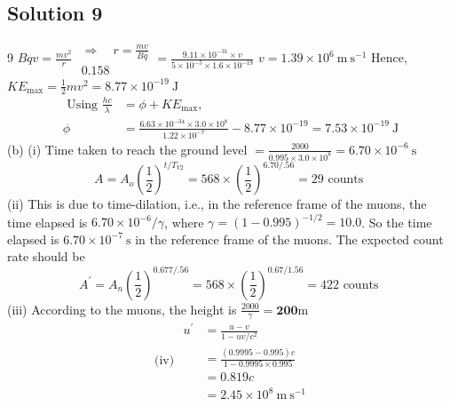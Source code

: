 \documentclass{article}
\begin{document}
\subsection{Solution 9}
9
$B q v=\frac{m v^{2}}{r}$ $\begin{aligned} \Rightarrow \quad r=\frac{m v}{B q} \\ 0.158 \end{aligned}=\frac{9.11 \times 10^{-31} \times v}{5 \times 10^{-5} \times 1.6 \times 10^{-19}}$ $v=1.39 \times 10^{6} \mathrm{~m} \mathrm{~s}^{-1}$ Hence, $K E_{\max }=\frac{1}{2} m v^{2}=8.77 \times 10^{-19} \mathrm{~J}$
$$
\begin{aligned}
	\text { Using } \frac{h c}{\lambda} &=\phi+K E_{\max }, \\
	\phi &=\frac{6.63 \times 10^{-34} \times 3.0 \times 10^{8}}{1.22 \times 10^{-7}}-8.77 \times 10^{-19}=7.53 \times 10^{-19} \mathrm{~J}
\end{aligned}
$$
(b) (i) Time taken to reach the ground level $=\frac{2000}{0.995 \times 3.0 \times 10^{8}}=6.70 \times 10^{-6} \mathrm{~s}$
$$
A=A_{o}\left(\frac{1}{2}\right)^{t / T_{V 2}}=568 \times\left(\frac{1}{2}\right)^{6.70 / .56}=29 \text { counts }
$$
(ii) This is due to time-dilation, i.e., in the reference frame of the muons, the time elapsed is $6.70 \times 10^{-6} / \gamma$, where $\gamma=(1-0.995)^{-1 / 2}=10.0$. So the time elapsed is $6.70 \times 10^{-7} \mathrm{~s}$ in the reference frame of the muons. The expected count rate should be
$$
A^{\prime}=A_{n}\left(\frac{1}{2}\right)^{0.677 / .56}=568 \times\left(\frac{1}{2}\right)^{0.67 / 1.56}=422 \text { counts }
$$
(iii) According to the muons, the height is $\frac{2000}{\gamma}=\mathbf{2 0 0} \mathrm{m}$
$$
\text { (iv) } \begin{aligned}
	u^{\prime} &=\frac{u-v}{1-u v / c^{2}} \\
	&=\frac{(0.9995-0.995) c}{1-0.9995 \times 0.995} \\
	&=0.819 c \\
	&=2.45 \times 10^{8} \mathrm{~m} \mathrm{~s}^{-1}
\end{aligned}
$$
\end{document}
